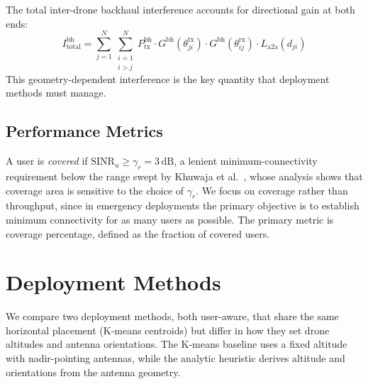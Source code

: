 \documentclass[conference]{IEEEtran}
\newcommand{\dB}{\,\mathrm{dB}}
\begin{document}
The total inter-drone backhaul interference accounts for directional gain at both ends:
\begin{equation}
I_{\mathrm{total}}^{\mathrm{bh}} = \sum_{j=1}^{N}\sum_{\substack{i=1\\i>j}}^{N} P_{\mathrm{tx}}^{\mathrm{bh}} \cdot G^{\mathrm{bh}}(\theta_{ji}^{\mathrm{tx}}) \cdot G^{\mathrm{bh}}(\theta_{ij}^{\mathrm{rx}}) \cdot L_{\mathrm{a2a}}(d_{ji})
\end{equation}
This geometry-dependent interference is the key quantity that deployment methods must manage.

\subsection{Performance Metrics}

A user is \emph{covered} if $\mathrm{SINR}_u \geq \gamma_r = 3\dB$, a lenient minimum-connectivity requirement below the range swept by Khuwaja et al.~\cite{khuwaja2019}, whose analysis shows that coverage area is sensitive to the choice of $\gamma_r$.
We focus on coverage rather than throughput, since in emergency deployments the primary objective is to establish minimum connectivity for as many users as possible.
The primary metric is coverage percentage, defined as the fraction of covered users.
\section{Deployment Methods}
\label{sec:methods}

We compare two deployment methods, both user-aware, that share the same horizontal placement (K-means centroids) but differ in how they set drone altitudes and antenna orientations.
The K-means baseline uses a fixed altitude with nadir-pointing antennas, while the analytic heuristic derives altitude and orientations from the antenna geometry.

\end{document}
